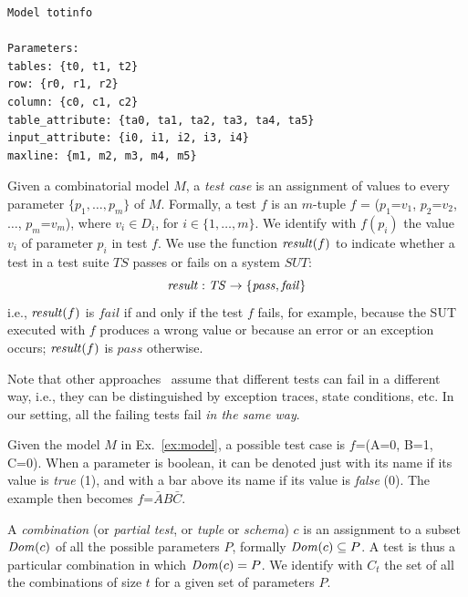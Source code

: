 \begin{tikzborder}{\cite{Gargantini16:validation}}
\begin{tikzborder}{\cite{gargantini_combinatorial_2017}}
\begin{tikzborder}{\cite{garn2019}}
\begin{tikzborder}{\cite{arcaini2019achieving}}
\begin{lstlisting}[basicstyle=\footnotesize\sffamily\linespread{1},frame = single,float,caption={A combinatorial model of the input of \textit{totinfo} program, in CTWedge},label={fig:totinfoModel}]
Model totinfo

Parameters:
tables: {t0, t1, t2}
row: {r0, r1, r2}
column: {c0, c1, c2}
table_attribute: {ta0, ta1, ta2, ta3, ta4, ta5}
input_attribute: {i0, i1, i2, i3, i4}
maxline: {m1, m2, m3, m4, m5}
\end{lstlisting}

\begin{tikzborder}{}
\begin{defn}\label{def:testCase}
	Given a combinatorial model $M$, a {\it test case} is an assignment of values to every parameter $\{p_1, \dots , p_m\}$ of $M$. Formally, a test $f$ is an $m$-tuple $f$ = ($p_1$=$v_1$, $p_2$=$v_2$, $\ldots$, $p_m$=$v_m$), where $v_i \in D_i$, for $i \in \{1, \ldots, m\}$. We identify with $f(p_i)$ the value $v_i$ of parameter $p_i$ in test $f$. We use the function $\mathit{result}(f)$ to indicate whether a test in a test suite $\mathit{TS}$ passes or fails on a system $\mathit{SUT}$: %
	\[\mathit{result}: \mathit{TS} \rightarrow \{\mathit{pass},\mathit{fail}\}\]
	i.e., $\mathit{result}(f)$ is $\mathit{fail}$ if and only if the test $f$ fails, for example, because the SUT executed with $f$ produces a wrong value or because an error or an exception occurs; $\mathit{result}(f)$ is $\mathit{pass}$ otherwise.
\end{defn}

Note that other approaches~\cite{Niu2018Identifying} assume that different tests can fail in a different way, i.e., they can be distinguished by exception traces, state conditions, etc. In our setting, all the failing tests fail {\it in the same way}.

\begin{example}
	Given the model $M$ in Ex.~\ref{ex:model}, a possible test case is $f$=(A=0, B=1, C=0). When a parameter is boolean, it can be denoted just with its name if its value is \textit{true} (1), and with a bar above its name if its value is \textit{false} (0). The example then becomes $f$=$\bar{A}B\bar{C}$.
\end{example}

\begin{defn}\label{def:combination}
	A \textit{combination} (or \textit{partial test}, or \textit{tuple} or \textit{schema}) $c$ is an assignment to a subset $\mathit{Dom}(c)$ of all the possible parameters $P$, formally $\mathit{Dom}(c) \subseteq P$. A test is thus a particular combination in which $\mathit{Dom}(c)=P$. We identify with $C_t$ the set of all the combinations of size $t$ for a given set of parameters $P$.
\end{defn}


\end{tikzborder}
\end{tikzborder}
\end{tikzborder}
\end{tikzborder}
\end{tikzborder}
